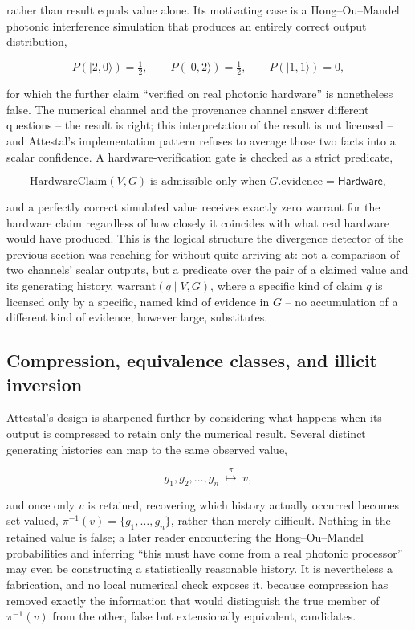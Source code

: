 \documentclass[11pt]{article}
\begin{document}
rather than result equals value alone. Its motivating case is a Hong--Ou--Mandel photonic interference simulation that produces an entirely correct output distribution,

\begin{equation}
P(|2,0\rangle) = \tfrac{1}{2}, \qquad P(|0,2\rangle) = \tfrac{1}{2}, \qquad P(|1,1\rangle) = 0,
\end{equation}

for which the further claim ``verified on real photonic hardware'' is nonetheless false. The numerical channel and the provenance channel answer different questions -- the result is right; this interpretation of the result is not licensed -- and Attestal's implementation pattern refuses to average those two facts into a scalar confidence. A hardware-verification gate is checked as a strict predicate,

\begin{equation}
\mathrm{HardwareClaim}(V, G) \;\text{is admissible only when}\; G.\mathrm{evidence} = \mathsf{Hardware},
\end{equation}

and a perfectly correct simulated value receives exactly zero warrant for the hardware claim regardless of how closely it coincides with what real hardware would have produced. This is the logical structure the divergence detector of the previous section was reaching for without quite arriving at: not a comparison of two channels' scalar outputs, but a predicate over the pair of a claimed value and its generating history, $\mathrm{warrant}(q \mid V, G)$, where a specific kind of claim $q$ is licensed only by a specific, named kind of evidence in $G$ -- no accumulation of a different kind of evidence, however large, substitutes.

\subsection{Compression, equivalence classes, and illicit inversion}

Attestal's design is sharpened further by considering what happens when its output is compressed to retain only the numerical result. Several distinct generating histories can map to the same observed value,

\begin{equation}
g_1, g_2, \ldots, g_n \;\overset{\pi}{\longmapsto}\; v,
\end{equation}

and once only $v$ is retained, recovering which history actually occurred becomes set-valued, $\pi^{-1}(v) = \{g_1, \ldots, g_n\}$, rather than merely difficult. Nothing in the retained value is false; a later reader encountering the Hong--Ou--Mandel probabilities and inferring ``this must have come from a real photonic processor'' may even be constructing a statistically reasonable history. It is nevertheless a fabrication, and no local numerical check exposes it, because compression has removed exactly the information that would distinguish the true member of $\pi^{-1}(v)$ from the other, false but extensionally equivalent, candidates.
\end{document}
